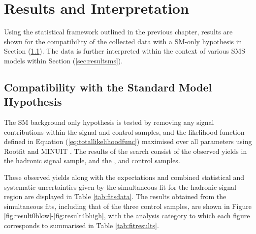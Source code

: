  \chapter{Results and Interpretation}
\label{chap:SUSYresults}

Using the statistical framework outlined in the previous chapter, results are shown for the compatibility of the collected data with a \ac{SM}-only hypothesis in Section (\ref{sec:smhypothesis}). The data is further interpreted within the context of various \ac{SMS} models within Section (\ref{sec:resultsms}). 

\section{Compatibility with the Standard Model Hypothesis}
\label{sec:smhypothesis}

The \ac{SM} background only hypothesis is tested by removing any signal contributions within the signal and control samples, and the likelihood function defined in Equation (\ref{eq:totallikelihoodfunc}) maximised over all parameters using Rootfit \cite{2010acat.confE..57M} and MINUIT \cite{James:1975dr}. The results of the search consist of the observed yields in the hadronic signal sample, and the \mupjets, \dimupjets and \gpjets control samples. 

These observed yields along with the expectations and combined statistical and systematic uncertainties given by the simultaneous fit for the hadronic signal region are displayed in Table \ref{tab:fitsdata}. The results obtained from the simultaneous fits, including that of the three control samples, are shown in Figure \ref{fig:result0blow}-\ref{fig:result4bhigh}, with the analysis category to which each figure corresponds to summarised in Table \ref{tab:fitresults}. 

